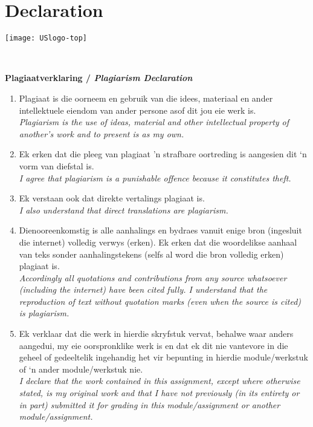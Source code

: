 \makeatletter
\newcommand{\unchapter}[1]{%
	\begingroup
	\let\@makeschapterhead\@gobble %
	\chapter*{#1}
	\endgroup
}
\makeatother

\unchapter{Declaration}
\begin{center}
\texttt{[image: USlogo-top]}
\makeatletter{}\makeatother
\\
{\rmfamily \bfseries \large Plagiaatverklaring / \textit{Plagiarism Declaration} \par}

\begin{enumerate}
	\item Plagiaat is die oorneem en gebruik van die idees, materiaal en ander intellektuele
	eiendom van ander persone asof dit jou eie werk is.\\
	\textit{Plagiarism is the use of ideas, material and other intellectual property of another’s work
	and to present is as my own.}
	
	\item Ek erken dat die pleeg van plagiaat 'n strafbare oortreding is aangesien dit ‘n vorm van
	diefstal is.\\
	\textit{I agree that plagiarism is a punishable offence because it constitutes theft.}
	
	\item Ek verstaan ook dat direkte vertalings plagiaat is.\\
	\textit{I also understand that direct translations are plagiarism.}
	
	\item Dienooreenkomstig is alle aanhalings en bydraes vanuit enige bron (ingesluit die
	internet) volledig verwys (erken). Ek erken dat die woordelikse aanhaal van teks
	sonder aanhalingstekens (selfs al word die bron volledig erken) plagiaat is.\\
	\textit{Accordingly all quotations and contributions from any source whatsoever (including the
	internet) have been cited fully. I understand that the reproduction of text without
	quotation marks (even when the source is cited) is plagiarism.}
	
	\item Ek verklaar dat die werk in hierdie skryfstuk vervat, behalwe waar anders aangedui, my
	eie oorspronklike werk is en dat ek dit nie vantevore in die geheel of gedeeltelik
	ingehandig het vir bepunting in hierdie module/werkstuk of ‘n ander module/werkstuk
	nie.\\
	\textit{I declare that the work contained in this assignment, except where otherwise stated, is
	my original work and that I have not previously (in its entirety or in part) submitted it for
	grading in this module/assignment or another module/assignment.}
\end{enumerate}


\end{center}

